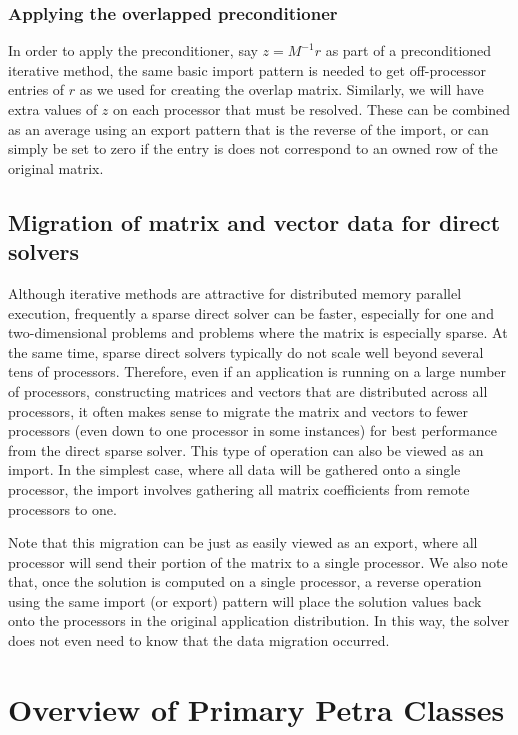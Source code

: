 \documentclass[10pt,relax]{PetraObjectModel}
\begin{document}
\subsubsection{Applying the overlapped preconditioner}

In order to apply the preconditioner, say $z = M^{-1}r$ as part of a
preconditioned iterative method, the same basic import pattern is
needed to get off-processor entries of $r$ as we used for creating
the overlap matrix.  Similarly, we will have extra values of $z$ on
each processor that must be resolved.  These can be combined as an
average using an export pattern that is the reverse of the import,
or can simply be set to zero if the entry is does not correspond to
an owned row of the original matrix.

\subsection{Migration of matrix and vector data for direct solvers}

Although iterative methods are attractive for distributed memory
parallel execution, frequently a sparse direct solver can be faster,
especially for one and two-dimensional problems and problems where
the matrix is especially sparse.  At the same time, sparse direct
solvers typically do not scale well beyond several tens of
processors.  Therefore, even if an application is running on a large
number of processors, constructing matrices and vectors that are
distributed across all processors, it often makes sense to migrate
the matrix and vectors to fewer processors (even down to one
processor in some instances) for best performance from the direct
sparse solver.  This type of operation can also be viewed as an
import.  In the simplest case, where all data will be gathered onto
a single processor, the import involves gathering all matrix
coefficients from remote processors to one.

Note that this migration can be just as easily viewed as an export,
where all processor will send their portion of the matrix to a
single processor.  We also note that, once the solution is computed
on a single processor, a reverse operation using the same import (or
export) pattern will place the solution values back onto the
processors in the original application distribution.  In this way,
the solver does not even need to know that the data migration
occurred.


\section{Overview of Primary Petra Classes}
\end{document}

